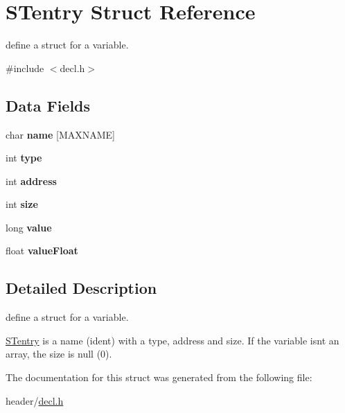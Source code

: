 \hypertarget{struct_s_tentry}{}\section{S\+Tentry Struct Reference}
\label{struct_s_tentry}


define a struct for a variable.  




{\ttfamily \#include $<$decl.\+h$>$}

\subsection*{Data Fields}
\begin{DoxyCompactItemize}
\item 
\mbox{\label{struct_s_tentry_afdd40a771835cf5f3511c7ac6fb6e664}} 
char {\bfseries name} \mbox{[}M\+A\+X\+N\+A\+ME\mbox{]}
\item 
\mbox{\label{struct_s_tentry_ac765329451135abec74c45e1897abf26}} 
int {\bfseries type}
\item 
\mbox{\label{struct_s_tentry_a45c6bc6d1135dc398bf8deae861a2ebc}} 
int {\bfseries address}
\item 
\mbox{\label{struct_s_tentry_a439227feff9d7f55384e8780cfc2eb82}} 
int {\bfseries size}
\item 
\mbox{\label{struct_s_tentry_a6ccc3a2456c4631091ce42a637053789}} 
long {\bfseries value}
\item 
\mbox{\label{struct_s_tentry_ab271bf689e787edf8ddff375682937d2}} 
float {\bfseries value\+Float}
\end{DoxyCompactItemize}


\subsection{Detailed Description}
define a struct for a variable. 

\hyperlink{struct_s_tentry}{S\+Tentry} is a name (ident) with a type, address and size. If the variable isn\textquotesingle{}t an array, the size is null (0). 

The documentation for this struct was generated from the following file\+:\begin{DoxyCompactItemize}
\item 
header/\hyperlink{decl_8h}{decl.\+h}\end{DoxyCompactItemize}
